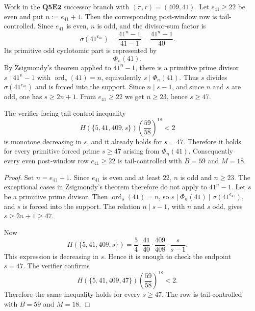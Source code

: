 \begin{criterion}[Parametric post-window closure for \texorpdfstring{\((\pi,r)=(409,41)\)}{(pi,r)=(409,41)}]
\label{crit:q5e2-pi409-r41-parametric-post-window}
Work in the \(\mathbf{Q5E2}\) successor branch with \((\pi,r)=(409,41)\).
Let \(e_{41}\ge22\) be even and put \(n:=e_{41}+1\).  Then the corresponding
post-window row is tail-controlled.  Since \(e_{41}\) is even, \(n\) is odd,
and the divisor-sum factor is
\[
  \sigma(41^{e_{41}})
  =
  \frac{41^n-1}{41-1}
  =
  \frac{41^n-1}{40}.
\]
Its primitive odd cyclotomic part is represented by
\[
  \Phi_n(41).
\]
By Zsigmondy's theorem applied to \(41^n-1\), there is a primitive prime
divisor \(s\mid41^n-1\) with \(\operatorname{ord}_s(41)=n\), equivalently
\(s\mid\Phi_n(41)\).  Thus \(s\) divides \(\sigma(41^{e_{41}})\) and is forced
into the support.  Since \(n\mid s-1\), and since \(n\) and \(s\) are odd, one
has \(s\ge2n+1\).  From \(e_{41}\ge22\) we get \(n\ge23\), hence \(s\ge47\).

The verifier-facing tail-control inequality
\[
  H(\{5,41,409,s\})
  \left(\frac{59}{58}\right)^{18}<2
\]
is monotone decreasing in \(s\), and it already holds for \(s=47\).  Therefore
it holds for every primitive forced prime \(s\ge47\) arising from
\(\Phi_n(41)\).  Consequently every even post-window row \(e_{41}\ge22\) is
tail-controlled with \(B=59\) and \(M=18\).
\end{criterion}

\begin{proof}
Set \(n=e_{41}+1\).  Since \(e_{41}\) is even and at least \(22\), \(n\) is odd
and \(n\ge23\).  The exceptional cases in Zsigmondy's theorem therefore do not
apply to \(41^n-1\).  Let \(s\) be a primitive prime divisor.  Then
\(\operatorname{ord}_s(41)=n\), so
\(s\mid\Phi_n(41)\mid\sigma(41^{e_{41}})\), and \(s\) is forced into the
support.  The relation \(n\mid s-1\), with \(n\) and \(s\) odd, gives
\(s\ge2n+1\ge47\).

Now
\[
  H(\{5,41,409,s\})
  =
  \frac54\cdot\frac{41}{40}\cdot\frac{409}{408}\cdot\frac{s}{s-1}.
\]
This expression is decreasing in \(s\).  Hence it is enough to check the
endpoint \(s=47\).  The verifier confirms
\[
  H(\{5,41,409,47\})
  \left(\frac{59}{58}\right)^{18}<2.
\]
Therefore the same inequality holds for every \(s\ge47\).  The row is
tail-controlled with \(B=59\) and \(M=18\).
\end{proof}


